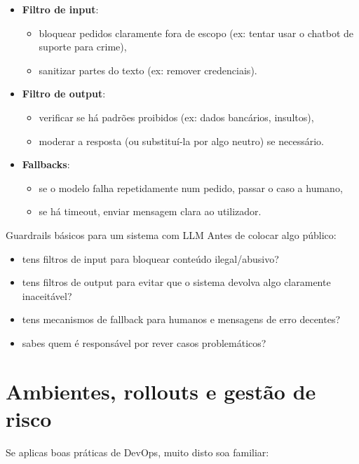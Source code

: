 \begin{itemize}[leftmargin=*]
\item \textbf{Filtro de input}:
\begin{itemize}[leftmargin=*]
\item bloquear pedidos claramente fora de escopo (ex: tentar usar o chatbot de suporte para crime),
\item sanitizar partes do texto (ex: remover credenciais).
\end{itemize}
\item \textbf{Filtro de output}:
\begin{itemize}[leftmargin=*]
\item verificar se há padrões proibidos (ex: dados bancários, insultos),
\item moderar a resposta (ou substituí-la por algo neutro) se necessário.
\end{itemize}
\item \textbf{Fallbacks}:
\begin{itemize}[leftmargin=*]
\item se o modelo falha repetidamente num pedido, passar o caso a humano,
\item se há timeout, enviar mensagem clara ao utilizador.
\end{itemize}
\end{itemize}

\begin{checklistbox}{Guardrails básicos para um sistema com LLM}
Antes de colocar algo público:

\begin{itemize}[leftmargin=*]
\item tens filtros de input para bloquear conteúdo ilegal/abusivo?
\item tens filtros de output para evitar que o sistema devolva algo claramente inaceitável?
\item tens mecanismos de fallback para humanos e mensagens de erro decentes?
\item sabes quem é responsável por rever casos problemáticos?
\end{itemize}
\end{checklistbox}

\section{Ambientes, rollouts e gestão de risco}

Se aplicas boas práticas de DevOps, muito disto soa familiar:

